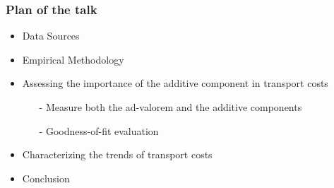 \documentclass[10 pt,Helvetica, french]{beamer}
\begin{document}
\begin{frame}
\frametitle{Plan of the talk}
\begin{itemize}
\item Data Sources  \vspace{0.1cm}
\item Empirical Methodology \vspace{0.1cm}
\item Assessing the importance of the additive component in transport costs \vspace{0.1cm}
\begin{itemize}
\item[-] Measure both the ad-valorem and the additive components  \vspace{0.1cm}
\item[-] Goodness-of-fit evaluation\vspace{0.1cm}
\end{itemize}
\item Characterizing the trends of transport costs \vspace{0.1cm}
\item Conclusion
\end{itemize}
\end{frame}
\end{document}
